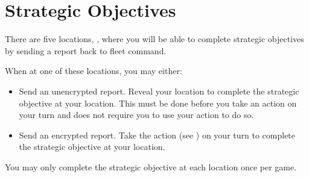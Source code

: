 \section*{Strategic Objectives}
There are five locations, \sansA{} \sansE{} \sansM{} \sansV{} \sansZ{}, where you will be able to complete strategic objectives by sending a report back to fleet command.

When at one of these locations, you may either:
\begin{itemize}[leftmargin=*]
	\item Send an unencrypted report. Reveal your location to complete the strategic objective at your location. This must be done before you take an action on your turn and does not require you to use your action to do so.
	\item Send an encrypted report. Take the \ENCRYPT{} action (see {}) on your turn to complete the strategic objective at your location.
\end{itemize}

You may only complete the strategic objective at each location once per game.


